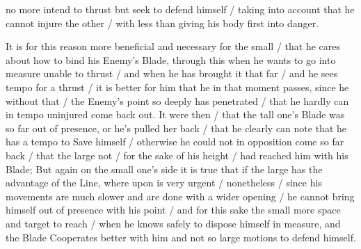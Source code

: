 \newpage


\newpage


no more intend to thrust but seek to defend himself / taking into
account that he cannot injure the other / with less than giving
his body first into danger.

It is for this reason more beneficial and necessary for the small /
that he cares about how to bind his Enemy's Blade, through this when he
wants to go into measure unable to thrust / and when he has brought it
that far / and he sees tempo for a thrust / it is better for him that
he in that moment passes, since he without that / 
the Enemy's point so deeply has penetrated / that he hardly can in
tempo uninjured come back out. It were then / that the tall one's
Blade was so far out of presence, or he's pulled her back / that he
clearly can note that he has a tempo to Save himself /
otherwise he could not in opposition come so far back / that the large
not / for the sake of his height / had reached him with his Blade; But
again on the small one's side it is true that if the large has the
advantage of the Line, where upon is very urgent / nonetheless /
since his movements are much slower and are done with a wider opening /
he cannot bring himself out of presence with his point / and for
this sake the small more space and target to reach / when he knows
safely to dispose himself in measure, and the Blade Cooperates better
with him and not so large motions to defend himself.

